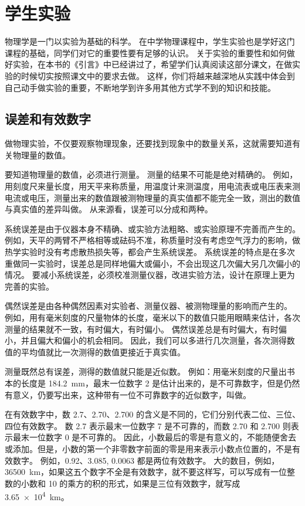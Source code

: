\chapter*{学生实验}

物理学是一门以实验为基础的科学。
在中学物理课程中，学生实验也是学好这门课程的基础，同学们对它的重要性要有足够的认识。
关于实验的重要性和如何做好实验，在本书的《引言》中已经讲过了，希望学们认真阅读这部分课文，在做实验的时候切实按照课文中的要求去做。
这样，你们将越来越深地从实践中体会到自己动手做实验的重要，不断地学到许多用其他方式学不到的知识和技能。
	
\section*{误差和有效数字}

做物理实验，不仅要观察物理现象，还要找到现象中的数量关系，这就需要知道有关物理量的数值。

要知道物理量的数值，必须进行测量。
测量的结果不可能是绝对精确的。
例如，用刻度尺来量长度，用天平来称质量，用温度计来测温度，用电流表或电压表来测电流或电压，测量出来的数值跟被测物理量的真实值都不能完全一致，测出的数值与真实值的差异叫做。
从来源看，误差可以分成和两种。

系统误差是由于仪器本身不精确、或实验方法粗略、或实验原理不完善而产生的。
例如，天平的两臂不严格相等或砝码不准，称质量时没有考虑空气浮力的影响，做热学实验时没有考虑散热损失等，都会产生系统误差。
系统误差的特点是在多次重做同一实验时，误差总是同样地偏大或偏小，不会出现这几次偏大另几次偏小的情况。
要减小系统误差，必须校准测量仪器，改进实验方法，设计在原理上更为完善的实验。

偶然误差是由各种偶然因素对实验者、测量仪器、被测物理量的影响而产生的。
例如，用有毫米刻度的尺量物体的长度，毫米以下的数值只能用眼睛来估计，各次测量的结果就不一致，有时偏大，有时偏小。
偶然误差总是有时偏大，有时偏小，并且偏大和偏小的机会相同。
因此，我们可以多进行几次测量，各次测得数值的平均值就比一次测得的数值更接近于真实值。

测量既然总有误差，测得的数值就只能是近似数。
例如：用毫米刻度的尺量出书本的长度是 \qty{184.2}{mm}，最末一位数字 2 是估计出来的，是不可靠数字，但是仍然有意义，仍要写出来，这种带有一位不可靠数字的近似数字，叫做。

在有效数字中，数 \num{2.7}、\num{2.70}、\num{2.700} 的含义是不同的，它们分别代表二位、三位、四位有效数字。
数 \num{2.7} 表示最末一位数字 7 是不可靠的，而数 \num{2.70} 和 \num{2.700} 则表示最末一位数字 0 是不可靠的。
因此，小数最后的零是有意义的，不能随便舍去或添加。但是，小数的第一个非零数字前面的零是用来表示小数点位置的，不是有效数字。
例如，\num{0.92}、\num{3.085}, \num{0.0063} 都是两位有效数字。
大的数目，例如，\qty{36500}{km}，如果这五个数字不全是有效数字，就不要这样写，可以写成有一位整数的小数和 10 的乘方的积的形式，如果是三位有效数字，就写成 \qty{3.65e4}{km}。

